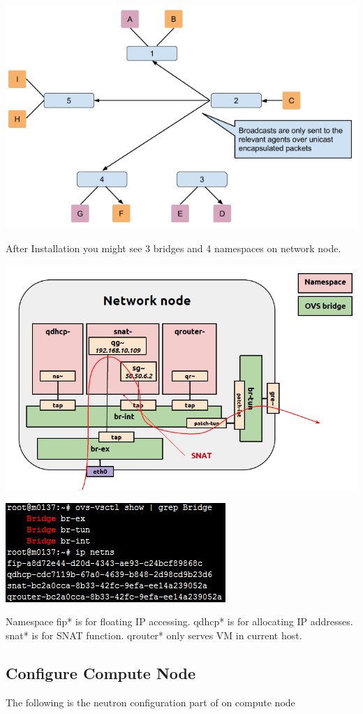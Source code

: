 \documentclass[letterpaper,10pt,english]{sphinxmanual}
\begin{document}
\includegraphics{image4.png}

After Installation you might see 3 bridges and 4 namespaces on network node.

\includegraphics{image5.png}

\includegraphics{image6.png}

Namespace fip* is for floating IP accessing. qdhcp* is for allocating IP addresses. snat* is for SNAT function. qrouter* only serves VM in current host.


\subsection{Configure Compute Node}
\label{docs/enable_dvr_with_devstack/index:configure-compute-node}
The following is the neutron configuration part of  on compute node
\end{document}
